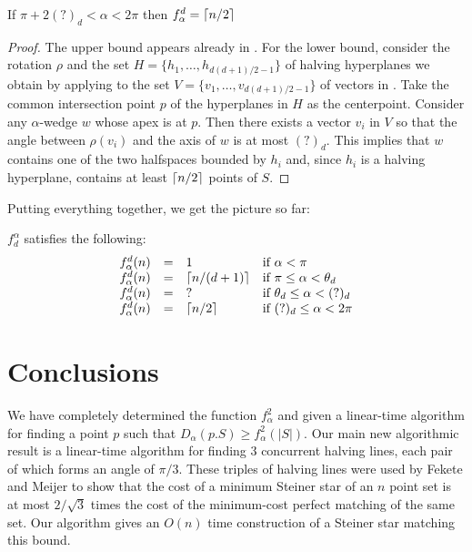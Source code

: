 \documentclass[lotsofwhite]{patmorin}
\newcommand{\crap}[1]{(?)_d}
\newcommand{\nov}{d(d+1)/2-1}
\begin{document}
\begin{lem}
If $\pi+2\crap{d} < \alpha < 2\pi$ then $f^d_\alpha = \left\lceil n/2 \right\rceil$
\end{lem}

\begin{proof}
The upper bound appears already in .  For the lower
bound, consider the rotation $\rho$ and the set
$H=\{h_1,\ldots,h_{\nov}\}$ of halving hyperplanes we obtain by
applying  to the set $V=\{v_1,\ldots,v_{\nov}\}$ of
vectors in .  Take the common intersection point $p$
of the hyperplanes in $H$ as the centerpoint. Consider any
$\alpha$-wedge $w$ whose apex is at $p$.  Then there exists a vector
$v_i$ in $V$ so that the angle between $\rho(v_i)$ and the axis of $w$
is at most $\crap{d}$.  This implies that $w$ contains one of the two
halfspaces bounded by $h_i$ and, since $h_i$ is a halving hyperplane,
contains at least $\left\lceil n/2 \right\rceil$ points of $S$.  
\end{proof}

Putting everything together, we get the picture so far:

\begin{lem}
$f^\alpha_d$ satisfies the following:
\[\begin{array}{lcll}
  f^d_\alpha(n) & = & 1 & \mbox{if $\alpha < \pi$} \\
  f^d_\alpha(n) & = & \ceil{n/(d+1)} & \mbox{if $\pi \le \alpha < \theta_d$} \\
  f^d_\alpha(n) & = & ? & \mbox{if $\theta_d \le \alpha < \crap{d}$} \\
  f^d_\alpha(n) & = & \ceil{n/2} & \mbox{if $\crap{d}\le \alpha < 2\pi$} \\
\end{array}\]
\end{lem}





\section{Conclusions}

We have completely determined the function $f^2_\alpha$ and given a
linear-time algorithm for finding a point $p$ such that
$D_\alpha(p.S)\ge f^2_\alpha(|S|)$.  Our main new algorithmic result
is a linear-time algorithm for finding 3 concurrent halving lines,
each pair of which forms an angle of $\pi/3$.  These triples of
halving lines were used by Fekete and Meijer to show that the cost of
a minimum Steiner star of an $n$ point set is at most $2/\sqrt{3}$
times the cost of the minimum-cost perfect matching of the same set.
Our algorithm gives an $O(n)$ time construction of a Steiner star
matching this bound.
\end{document}
